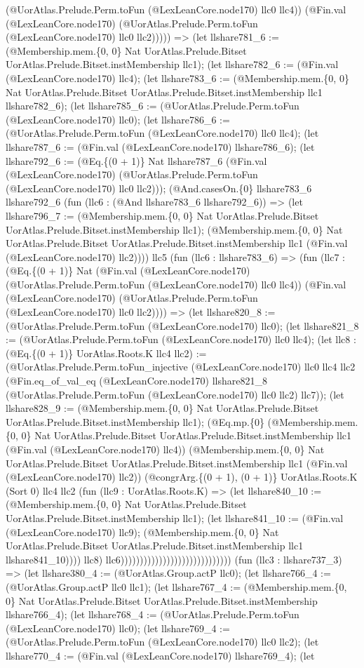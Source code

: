 \documentclass[11pt]{article}
\begin{document}
(@UorAtlas.Prelude.Perm.toFun (@LexLeanCore.node170) llc0 llc4)) (@Fin.val (@LexLeanCore.node170) (@UorAtlas.Prelude.Perm.toFun (@LexLeanCore.node170) llc0 llc2))))) => (let llshare781\_6 := (@Membership.mem.\{0, 0\} Nat UorAtlas.Prelude.Bitset UorAtlas.Prelude.Bitset.instMembership llc1); (let llshare782\_6 := (@Fin.val (@LexLeanCore.node170) llc4); (let llshare783\_6 := (@Membership.mem.\{0, 0\} Nat UorAtlas.Prelude.Bitset UorAtlas.Prelude.Bitset.instMembership llc1 llshare782\_6); (let llshare785\_6 := (@UorAtlas.Prelude.Perm.toFun (@LexLeanCore.node170) llc0); (let llshare786\_6 := (@UorAtlas.Prelude.Perm.toFun (@LexLeanCore.node170) llc0 llc4); (let llshare787\_6 := (@Fin.val (@LexLeanCore.node170) llshare786\_6); (let llshare792\_6 := (@Eq.\{(0 + 1)\} Nat llshare787\_6 (@Fin.val (@LexLeanCore.node170) (@UorAtlas.Prelude.Perm.toFun (@LexLeanCore.node170) llc0 llc2))); (@And.casesOn.\{0\} llshare783\_6 llshare792\_6 (fun (llc6 : (@And llshare783\_6 llshare792\_6)) => (let llshare796\_7 := (@Membership.mem.\{0, 0\} Nat UorAtlas.Prelude.Bitset UorAtlas.Prelude.Bitset.instMembership llc1); (@Membership.mem.\{0, 0\} Nat UorAtlas.Prelude.Bitset UorAtlas.Prelude.Bitset.instMembership llc1 (@Fin.val (@LexLeanCore.node170) llc2)))) llc5 (fun (llc6 : llshare783\_6) => (fun (llc7 : (@Eq.\{(0 + 1)\} Nat (@Fin.val (@LexLeanCore.node170) (@UorAtlas.Prelude.Perm.toFun (@LexLeanCore.node170) llc0 llc4)) (@Fin.val (@LexLeanCore.node170) (@UorAtlas.Prelude.Perm.toFun (@LexLeanCore.node170) llc0 llc2)))) => (let llshare820\_8 := (@UorAtlas.Prelude.Perm.toFun (@LexLeanCore.node170) llc0); (let llshare821\_8 := (@UorAtlas.Prelude.Perm.toFun (@LexLeanCore.node170) llc0 llc4); (let llc8 : (@Eq.\{(0 + 1)\} UorAtlas.Roots.K llc4 llc2) := (@UorAtlas.Prelude.Perm.toFun\_injective (@LexLeanCore.node170) llc0 llc4 llc2 (@Fin.eq\_of\_val\_eq (@LexLeanCore.node170) llshare821\_8 (@UorAtlas.Prelude.Perm.toFun (@LexLeanCore.node170) llc0 llc2) llc7)); (let llshare828\_9 := (@Membership.mem.\{0, 0\} Nat UorAtlas.Prelude.Bitset UorAtlas.Prelude.Bitset.instMembership llc1); (@Eq.mp.\{0\} (@Membership.mem.\{0, 0\} Nat UorAtlas.Prelude.Bitset UorAtlas.Prelude.Bitset.instMembership llc1 (@Fin.val (@LexLeanCore.node170) llc4)) (@Membership.mem.\{0, 0\} Nat UorAtlas.Prelude.Bitset UorAtlas.Prelude.Bitset.instMembership llc1 (@Fin.val (@LexLeanCore.node170) llc2)) (@congrArg.\{(0 + 1), (0 + 1)\} UorAtlas.Roots.K (Sort 0) llc4 llc2 (fun (llc9 : UorAtlas.Roots.K) => (let llshare840\_10 := (@Membership.mem.\{0, 0\} Nat UorAtlas.Prelude.Bitset UorAtlas.Prelude.Bitset.instMembership llc1); (let llshare841\_10 := (@Fin.val (@LexLeanCore.node170) llc9); (@Membership.mem.\{0, 0\} Nat UorAtlas.Prelude.Bitset UorAtlas.Prelude.Bitset.instMembership llc1 llshare841\_10)))) llc8) llc6))))))))))))))))))))))))))))) (fun (llc3 : llshare737\_3) => (let llshare380\_4 := (@UorAtlas.Group.actP llc0); (let llshare766\_4 := (@UorAtlas.Group.actP llc0 llc1); (let llshare767\_4 := (@Membership.mem.\{0, 0\} Nat UorAtlas.Prelude.Bitset UorAtlas.Prelude.Bitset.instMembership llshare766\_4); (let llshare768\_4 := (@UorAtlas.Prelude.Perm.toFun (@LexLeanCore.node170) llc0); (let llshare769\_4 := (@UorAtlas.Prelude.Perm.toFun (@LexLeanCore.node170) llc0 llc2); (let llshare770\_4 := (@Fin.val (@LexLeanCore.node170) llshare769\_4); (let 
\end{document}

